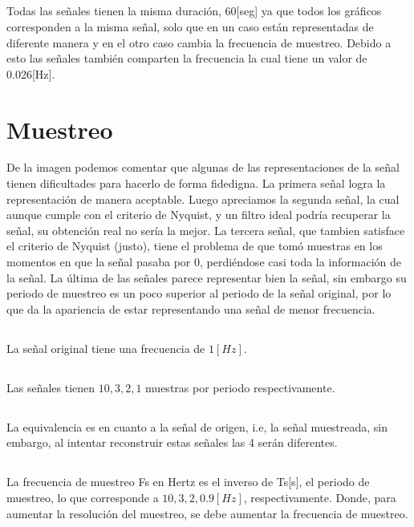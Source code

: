 \documentclass[11pt, letterpaper, titlepage]{article}
\begin{document}
\subsection{}
Todas las señales tienen la misma duración, 60[seg] ya que todos los gráficos corresponden a la misma señal, solo que en un caso están representadas de diferente manera y en el otro caso cambia la frecuencia de muestreo. Debido a esto las señales también comparten la frecuencia la cual tiene un valor de 0.026[Hz].



\section{Muestreo}
De la imagen podemos comentar que algunas de las representaciones de la señal tienen dificultades para hacerlo de forma fidedigna. La primera señal logra la representación de manera aceptable. Luego apreciamos la segunda señal, la cual aunque cumple con el criterio de Nyquist, y un filtro ideal podría recuperar la señal, su obtención real no sería la mejor. La tercera señal, que tambien satisface el criterio de Nyquist (justo), tiene el problema de que tomó muestras en los momentos en que la señal pasaba por 0, perdiéndose casi toda la información de la señal. La última de las señales parece representar bien la señal, sin embargo su periodo de muestreo es un poco superior al periodo de la señal original, por lo que da la apariencia de estar representando una señal de menor frecuencia.
\subsection{}
La señal original tiene una frecuencia de $1[Hz]$.
\subsection{}
Las señales tienen $10, 3, 2, 1$ muestras por periodo respectivamente.
\subsection{}
La equivalencia es en cuanto a la señal de origen, i.e, la señal muestreada, sin embargo, al intentar reconstruir estas señales las 4 serán diferentes.
\subsection{}
La frecuencia de muestreo Fs en Hertz es el inverso de Ts[s], el periodo de muestreo, lo que corresponde a $10, 3, 2, 0.9[Hz]$, respectivamente. Donde, para aumentar la resolución del muestreo, se debe aumentar la frecuencia de muestreo.
\end{document}
